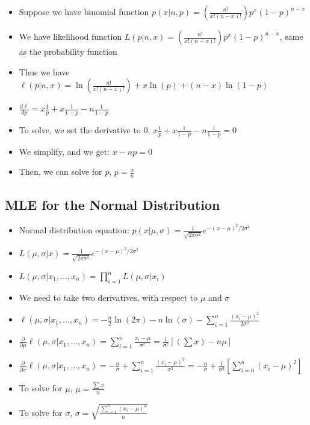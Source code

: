 \documentclass{article}
\begin{document}
\begin{itemize}
    \item Suppose we have binomial function $p(x | n, p)=(\frac{n!}{x!(n-x)!})p^x(1-p)^{n-x}$
    \item We have likelihood function $L(p | n, x)=(\frac{n!}{x!(n-x)!})p^x(1-p)^{n-x}$, same as the probability function
    \item Thus we have $\ell(p | n, x)=\ln(\frac{n!}{x!(n-x)!})+x\ln(p)+(n-x)\ln(1-p)$
    \item $\frac{d \ell}{dp}=x\frac{1}{p}+x\frac{1}{1-p}-n\frac{1}{1-p}$
    \item To solve, we set the derivative to $0$, $x\frac{1}{p}+x\frac{1}{1-p}-n\frac{1}{1-p}=0$
    \item We simplify, and we get: $x-np=0$
    \item Then, we can solve for $p$, $p=\frac{x}{n}$
\end{itemize}

\subsection{MLE for the Normal Distribution}

\begin{itemize}
    \item Normal distribution equation: $p(x| \mu, \sigma)=\frac{1}{\sqrt{2 \pi \sigma^2}}e^{-(x-\mu)^2/2\sigma^2}$
    \item $L(\mu, \sigma | x)=\frac{1}{\sqrt{2 \pi \sigma^2}}e^{-(x-\mu)^2/2\sigma^2}$
    \item  $L(\mu, \sigma | x_1,...,x_n)=\prod_{i=1}^n L(\mu, \sigma | x_i)$
    \item We need to take two derivatives, with respect to $\mu$ and $\sigma$
    \item $\ell(\mu, \sigma | x_1,...,x_n)=-\frac{n}{2}\ln(2\pi)-n\ln(\sigma)-\sum_{i=1}^n \frac{(x_i-\mu)^2}{2\sigma^2}$
    \item $\frac{\partial}{\partial \mu}\ell(\mu, \sigma | x_1,...,x_n)=\sum_{i=1}^n \frac{x_i-\mu}{\sigma^2}=\frac{1}{\sigma^2}[(\sum x)-n\mu]$
    \item $\frac{\partial}{\partial \sigma}\ell(\mu, \sigma | x_1,...,x_n)=-\frac{n}{\sigma}+\sum_{i=1}^n \frac{(x_i-\mu)^2}{\sigma^3}=-\frac{n}{\sigma}+\frac{1}{\sigma^3}[\sum_{i=0}^n (x_i-\mu)^2]$
    \item To solve for $\mu$, $\mu=\frac{\sum x}{n}$
    \item To solve for $\sigma$, $\sigma=\sqrt{\frac{\sum_{i=1}^n (x_i-\mu)^2}{n}}$
\end{itemize}
\end{document}
